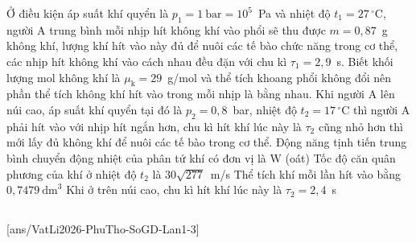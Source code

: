 	\begin{ex}%
		Ở điều kiện áp suất khí quyển là $p_1=1~\text{bar}=10^5$~Pa và nhiệt độ $t_1=27\,^\circ\text{C}$, người A trung bình mỗi nhịp hít không khí vào phổi sẽ thu được $m=0{,}87$~g không khí, lượng khí hít vào này đủ để nuôi các tế bào chức năng trong cơ thể, các nhịp hít không khí vào cách nhau đều đặn với chu kì $\tau_1=2{,}9$~s. Biết khối lượng mol không khí là $\mu_\text{k}=29$~g/mol và thể tích khoang phổi không đổi nên phần thể tích không khí hít vào trong mỗi nhịp là bằng nhau. Khi người A lên núi cao, áp suất khí quyển tại đó là $p_2=0{,}8$~bar, nhiệt độ $t_2=17\,^\circ\text{C}$ thì người A phải hít vào với nhịp hít ngắn hơn, chu kì hít khí lúc này là $\tau_2$ cũng nhỏ hơn thì mới lấy đủ không khí để nuôi các tế bào trong cơ thể.
		\choiceTFt
		{Động năng tịnh tiến trung bình chuyển động nhiệt của phân tử khí có đơn vị là W (oát)}
		{\True Tốc độ căn quân phương của khí ở nhiệt độ $t_2$ là $30\sqrt{277}$~m/s}
		{\True Thể tích khí mỗi lần hít vào bằng $0{,}7479~\text{dm}^3$}
		{\True Khi ở trên núi cao, chu kì hít khí lúc này là $\tau_2=2{,}4$~s}
	\end{ex}

	\subsection*{}
	\setcounter{ex}{0}
	[ans/VatLi2026-PhuTho-SoGD-Lan1-3]

